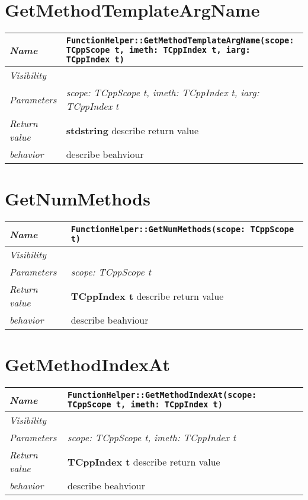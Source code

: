  \section{GetMethodTemplateArgName}
\begin{longtable}{p{3cm} @{\hskip 1cm} p{12cm}}
 \hline
\textit{Name} & \texttt{FunctionHelper::GetMethodTemplateArgName(scope: TCppScope t, imeth: TCppIndex t, iarg: TCppIndex t)}\\
\hline
 \textit{Visibility} & \\
\hline
\textit{Parameters} & \textit{scope: TCppScope t, imeth: TCppIndex t, iarg: TCppIndex t}\\
\hline
\textit{Return value} & \textbf{ stdstring} describe return value\\
  \hline
 \textit{behavior} & describe beahviour \\
\hline
\end{longtable} \pagebreak
 \section{GetNumMethods}
\begin{longtable}{p{3cm} @{\hskip 1cm} p{12cm}}
 \hline
\textit{Name} & \texttt{FunctionHelper::GetNumMethods(scope: TCppScope t)}\\
\hline
 \textit{Visibility} & \\
\hline
\textit{Parameters} & \textit{scope: TCppScope t}\\
\hline
\textit{Return value} & \textbf{ TCppIndex t} describe return value\\
  \hline
 \textit{behavior} & describe beahviour \\
\hline
\end{longtable} \pagebreak
 \section{GetMethodIndexAt}
\begin{longtable}{p{3cm} @{\hskip 1cm} p{12cm}}
 \hline
\textit{Name} & \texttt{FunctionHelper::GetMethodIndexAt(scope: TCppScope t, imeth: TCppIndex t)}\\
\hline
 \textit{Visibility} & \\
\hline
\textit{Parameters} & \textit{scope: TCppScope t, imeth: TCppIndex t}\\
\hline
\textit{Return value} & \textbf{ TCppIndex t} describe return value\\
  \hline
 \textit{behavior} & describe beahviour \\
\hline
\end{longtable} \pagebreak
